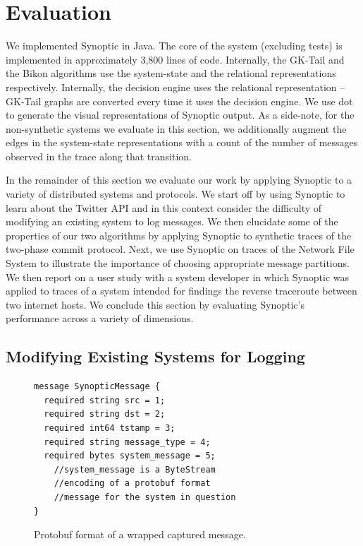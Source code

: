 \section{Evaluation}
\label{sec:evaluation}

We implemented Synoptic in Java. The core of the system (excluding
tests) is implemented in approximately 3,800 lines of
code. Internally, the GK-Tail and the Bikon algorithms use the
system-state and the relational representations
respectively. Internally, the decision engine uses the relational
representation -- GK-Tail graphs are converted every time it uses the
decision engine. We use dot~\cite{dot} to generate the visual
representations of Synoptic output. As a side-note, for the
non-synthetic systems we evaluate in this section, we additionally
augment the edges in the system-state representations with a count of
the number of messages observed in the trace along that transition.

In the remainder of this section we evaluate our work by applying
Synoptic to a variety of distributed systems and protocols. We start
off by using Synoptic to learn about the Twitter API and in this
context consider the difficulty of modifying an existing system to log
messages. We then elucidate some of the properties of our two
algorithms by applying Synoptic to synthetic traces of the two-phase
commit protocol. Next, we use Synoptic on traces of the Network File
System to illustrate the importance of choosing appropriate message
partitions. We then report on a user study with a system developer in
which Synoptic was applied to traces of a system intended for findings
the reverse traceroute between two internet hosts. We conclude this
section by evaluating Synoptic's performance across a variety of
dimensions.


\subsection{Modifying Existing Systems for Logging}

\begin{figure}[!t]
\small
\begin{verbatim}
message SynopticMessage {
  required string src = 1;
  required string dst = 2;
  required int64 tstamp = 3;
  required string message_type = 4;
  required bytes system_message = 5;
    //system_message is a ByteStream
    //encoding of a protobuf format
    //message for the system in question
}
\end{verbatim}                                 
\caption{Protobuf format of a wrapped captured message.}
\label{fig:protobuf_example}
\end{figure}

